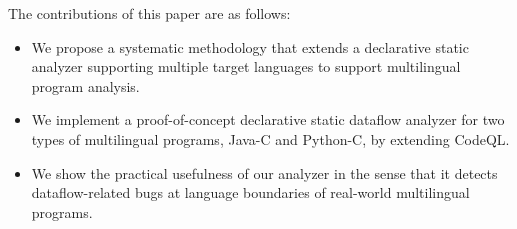 The contributions of this paper are as follows:
\begin{itemize}
\item We propose a systematic methodology that extends a declarative static analyzer
supporting multiple target languages to support multilingual program analysis.

\item We implement a proof-of-concept declarative static dataflow analyzer for two
types of multilingual programs, Java-C and Python-C, by extending CodeQL.

\item We show the practical usefulness of our analyzer in the sense that it detects
dataflow-related bugs at language boundaries of real-world multilingual
programs.
\end{itemize}
